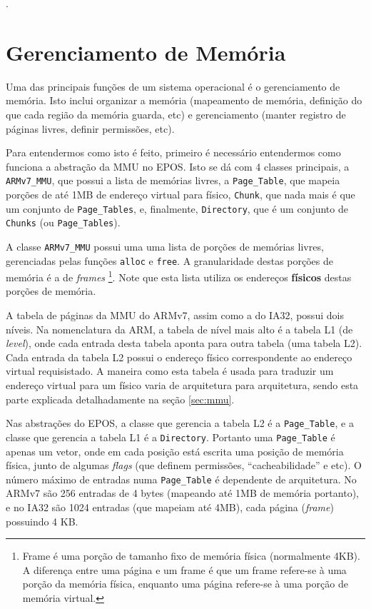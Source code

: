 . 



\section{Gerenciamento de Memória}
\label{sec:gerenciamento}
Uma das principais funções de um sistema operacional é o gerenciamento de memória. Isto inclui organizar a memória (mapeamento de memória, definição do que cada região da memória guarda, etc) e gerenciamento (manter registro de páginas livres, definir permissões, etc).

Para entendermos como isto é feito, primeiro é necessário entendermos como funciona a abstração da MMU no EPOS. Isto se dá com 4 classes principais, a \verb+ARMv7_MMU+, que possui a lista de memórias livres, a \verb+Page_Table+, que mapeia porções de até 1MB de endereço virtual para físico, \verb+Chunk+, que nada mais é que um conjunto de \verb+Page_Tables+, e, finalmente, \verb+Directory+, que é um conjunto de \verb+Chunks+ (ou \verb+Page_Tables+).

A classe \verb+ARMv7_MMU+ possui uma uma lista de porções de memórias livres, gerenciadas pelas funções \verb+alloc+ e \verb+free+. A granularidade destas porções de memória é a de \emph{frames}
\footnote{Frame é uma porção de tamanho fixo de memória física (normalmente 4KB). A diferença entre uma página e um frame é que um frame refere-se à uma porção da memória física, enquanto uma página refere-se à uma porção de memória virtual.}.
Note que esta lista utiliza os endereços \textbf{físicos} destas porções de memória.

A tabela de páginas da MMU do ARMv7, assim como a do IA32, possui dois níveis. Na nomenclatura da ARM, a tabela de nível mais alto é a tabela L1 (de \emph{level}), onde cada entrada desta tabela aponta para outra tabela (uma tabela L2).
Cada entrada da tabela L2 possui o endereço físico correspondente ao endereço virtual requisistado. A maneira como esta tabela é usada para traduzir um endereço virtual para um físico varia de arquitetura para arquitetura, sendo esta parte explicada detalhadamente na seção \ref{sec:mmu}.

Nas abstrações do EPOS, a classe que gerencia a tabela L2 é a \verb+Page_Table+, e a classe que gerencia a tabela L1 é a \verb+Directory+. Portanto uma \verb+Page_Table+ é apenas um vetor, onde em cada posição está escrita uma posição de memória física, junto de algumas \emph{flags} (que definem permissões, ``cacheabilidade'' e etc). O número máximo de entradas numa \verb+Page_Table+ é dependente de arquitetura. No ARMv7 são 256 entradas de 4 bytes (mapeando até 1MB de memória portanto), e no IA32 são 1024 entradas (que mapeiam até 4MB), cada página (\emph{frame}) possuindo 4 KB.


